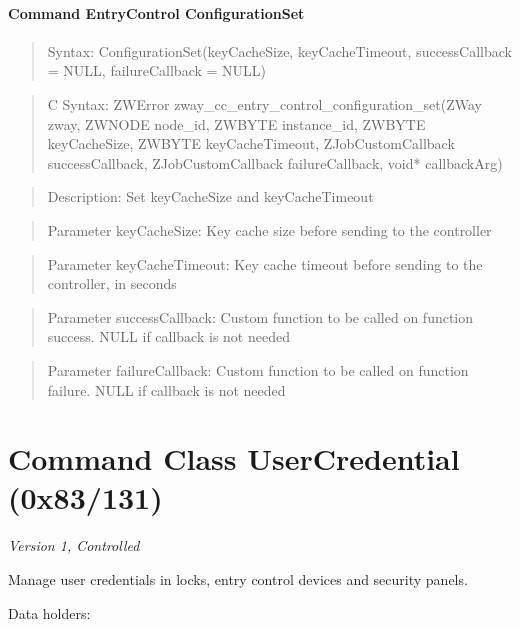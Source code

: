 \paragraph{Command EntryControl ConfigurationSet}
\begin{quote}Syntax: ConfigurationSet(keyCacheSize, keyCacheTimeout, successCallback = NULL, failureCallback = NULL)\end{quote}
\begin{quote}C Syntax: ZWError zway\_cc\_entry\_control\_configuration\_set(ZWay zway, ZWNODE node\_id, ZWBYTE instance\_id, ZWBYTE keyCacheSize, ZWBYTE keyCacheTimeout, ZJobCustomCallback successCallback, ZJobCustomCallback failureCallback, void* callbackArg)\end{quote}
\begin{quote}Description: Set keyCacheSize and keyCacheTimeout\end{quote}
\begin{quote}Parameter keyCacheSize: Key cache size before sending to the controller\end{quote}
\begin{quote}Parameter keyCacheTimeout: Key cache timeout before sending to the controller, in seconds\end{quote}
\begin{quote}Parameter successCallback: Custom function to be called on function success. NULL if callback is not needed\end{quote}
\begin{quote}Parameter failureCallback: Custom function to be called on function failure. NULL if callback is not needed\end{quote}



\section{Command Class UserCredential (0x83/131)}

\textit{Version 1, Controlled}
\newline

Manage user credentials in locks, entry control devices and security panels.
\newline

\noindent
Data holders:

